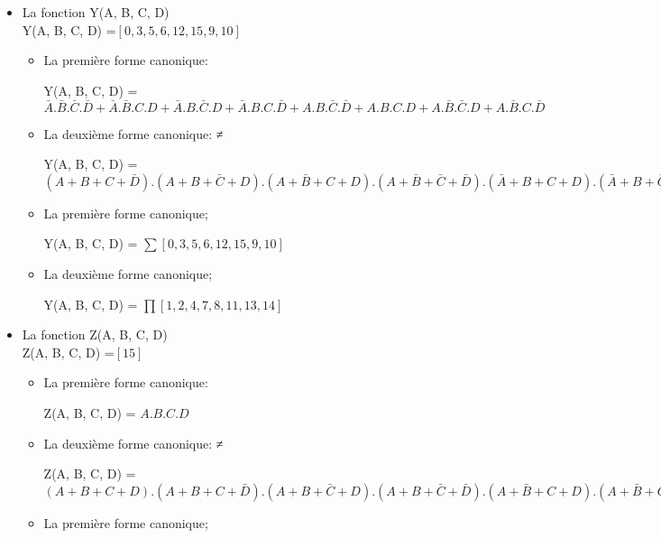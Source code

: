 \begin{enumerate}
\begin{itemize}
\begin{itemize}
X(A, B, C, D) = $\sum [1, 2, 4, 8]$
\item La deuxième forme canonique;  

 X(A, B, C, D) = $\prod [0, 3, 5, 6, 7, 9, 10, 11, 12, 13, 14, 15]$
\end{itemize}\item La fonction Y(A, B, C, D) \\Y(A, B, C, D) =$[0, 3, 5, 6, 12, 15, 9, 10]$


\begin{itemize}
\item La première forme canonique: 

Y(A, B, C, D) = $\bar A.\bar B.\bar C.\bar D + \bar A.\bar B.C.D + \bar A.B.\bar C.D + \bar A.B.C.\bar D + A.B.\bar C.\bar D + A.B.C.D + A.\bar B.\bar C.D + A.\bar B.C.\bar D$
\item La deuxième forme canonique: ≠

 Y(A, B, C, D) = $(A+B+C+\bar D) . (A+B+\bar C+D) . (A+\bar B+C+D) . (A+\bar B+\bar C+\bar D) . (\bar A+B+C+D) . (\bar A+B+\bar C+\bar D) . (\bar A+\bar B+C+\bar D) . (\bar A+\bar B+\bar C+D)$
\item La première forme canonique; 

Y(A, B, C, D) = $\sum [0, 3, 5, 6, 12, 15, 9, 10]$
\item La deuxième forme canonique;  

 Y(A, B, C, D) = $\prod [1, 2, 4, 7, 8, 11, 13, 14]$
\end{itemize}\item La fonction Z(A, B, C, D) \\Z(A, B, C, D) =$[15]$


\begin{itemize}
\item La première forme canonique: 

Z(A, B, C, D) = $A.B.C.D$
\item La deuxième forme canonique: ≠

 Z(A, B, C, D) = $(A+B+C+D) . (A+B+C+\bar D) . (A+B+\bar C+D) . (A+B+\bar C+\bar D) . (A+\bar B+C+D) . (A+\bar B+C+\bar D) . (A+\bar B+\bar C+D) . (A+\bar B+\bar C+\bar D) . (\bar A+B+C+D) . (\bar A+B+C+\bar D) . (\bar A+B+\bar C+D) . (\bar A+B+\bar C+\bar D) . (\bar A+\bar B+C+D) . (\bar A+\bar B+C+\bar D) . (\bar A+\bar B+\bar C+D)$
\item La première forme canonique; 


\end{itemize}
\end{itemize}
\end{enumerate}
